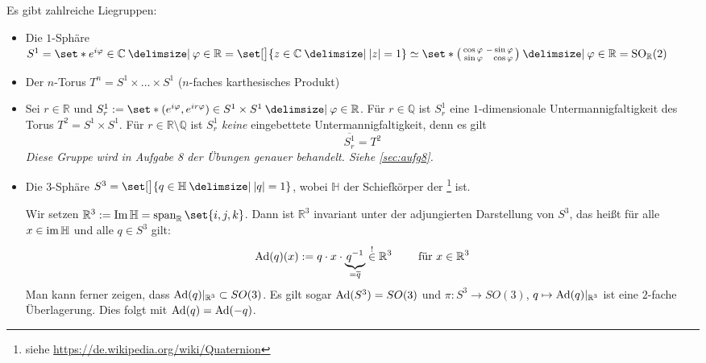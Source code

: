 \begin{beispiel*}[{name=[{Liegruppen}]}]
	Es gibt zahlreiche Liegruppen: 
	\begin{itemize}
		\item Die $1$-Sphäre $S^1 = \set*{e^{i \varphi} \in \mathbb{C} \given \varphi \in \mathbb{R}} = \set[\big]{z \in \mathbb{C} \given \abs*{z}=1} \simeq \set*{\begin{psmallmatrix*}[r]
			\cos \varphi & - \sin \varphi \\
			\sin \varphi & \cos \varphi
		\end{psmallmatrix*} \given \varphi \in \mathbb{R}} = \SO_\mathbb{R}(2)$
		\item Der $n$-Torus $T^n = S^1 \times \ldots \times S^1 $ ($n$-faches karthesisches Produkt)
		\item Sei $r \in \mathbb{R}$ und $S^1_r := \set*{\enbrace{e^{i \varphi}, e^{i r \varphi}} \in S^1 \times S^1 \given \varphi \in \mathbb{R}}$.
		Für $r \in \mathbb{Q}$ ist $S^1_r$ eine $1$-dimensionale Untermannigfaltigkeit des Torus $T^2= S^1 \times S^1$.
		Für $r \in \mathbb{R} \setminus \mathbb{Q}$ ist $S^1_r$ \emph{keine} eingebettete Untermannigfaltigkeit, denn es gilt 
		\[
			\overline{S^1_r} = T^2
		\]
		\emph{Diese Gruppe wird in Aufgabe 8 der Übungen genauer behandelt. Siehe \cref{sec:aufg8}.}
		\item Die $3$-Sphäre $S^3 = \set[\big]{q \in \mathbb{H} \given \abs*{q}=1}$, wobei $\mathbb{H}$ der Schiefkörper der \footnote{siehe \url{https://de.wikipedia.org/wiki/Quaternion}} ist.
	
		Wir setzen $\mathbb{R}^3 := \Im \mathbb{H} = \Span_\mathbb{R} \set{i,j,k}$.
		Dann ist $\mathbb{R}^3$ invariant unter der adjungierten Darstellung von $S^3$, das heißt für alle $x \in \operatorname{im} \mathbb{H}$ und alle $q \in S^3$ gilt:
		\[
			\operatorname{Ad}(q)(x) := q \cdot x \cdot {\underbrace{q^{-1}}_{=\overline{q}}} \stackrel{!}{\in} \mathbb{R}^3 \qquad \text{ für } x \in \mathbb{R}^3 
		\]
		Man kann ferner zeigen, dass $\operatorname{Ad}(q)|_{\mathbb{R}^3} \subset SO(3)$.
		Es gilt sogar $\operatorname{Ad}(S^3) = SO(3)$ und $\pi \colon S^3 \to SO(3)$, $q \mapsto \operatorname{Ad}(q)|_{\mathbb{R}^3}$ ist eine $2$-fache Überlagerung.
		Dies folgt mit $\operatorname{Ad}(q)=\operatorname{Ad}(-q)$.
		

\end{itemize}
\end{beispiel*}
